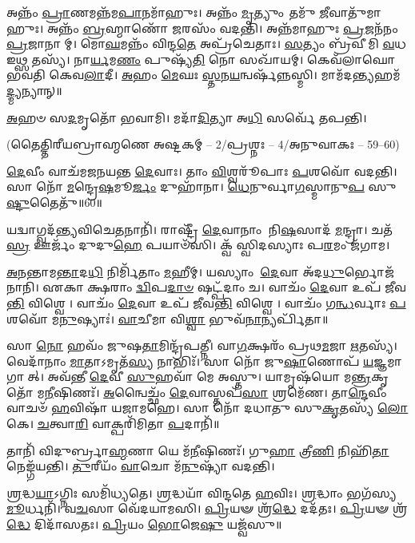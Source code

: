 𑌅𑌨𑍍𑌨𑌂᳴ \ul{𑌪𑍍𑌰𑌾}\-𑌣𑌮𑌨𑍍𑌨᳴𑌮\-\ul{𑌪𑌾}\-𑌨𑌮𑌾᳴𑌹𑍁𑌃।
𑌅𑌨𑍍𑌨𑌂᳴ \ul{𑌮𑍃}\-𑌤𑍍𑌯𑍁𑌂 𑌤𑌮𑍁᳴ \ul{𑌜𑍀}\-𑌵𑌾𑌤𑍁᳴𑌮𑌾𑌹𑍁𑌃।
𑌅𑌨𑍍𑌨𑌂᳴ \ul{𑌬𑍍𑌰}\-𑌹𑍍𑌮𑌾𑌣𑍋᳴ \ul{𑌜}\-𑌰𑌸𑌂᳴  𑌵𑌦𑌨𑍍𑌤𑌿।
𑌅𑌨𑍍𑌨᳴𑌮𑌾𑌹𑍁𑌃 \ul{𑌪𑍍𑌰}\-𑌜𑌨᳴𑌨𑌂 \ul{𑌪𑍍𑌰}\-𑌜𑌾𑌨𑌾𑌮𑍍।
𑌮𑍋\-\ul{𑌘}\-𑌮𑌨𑍍𑌨𑌂᳴ 𑌵𑌿𑌨𑍍𑌦\-\ul{𑌤𑍇} 𑌅𑌪𑍍𑌰᳴𑌚𑍇𑌤𑌾𑌃।
\-\ul{𑌸}\-𑌤𑍍𑌯𑌂 𑌬𑍍𑌰᳴𑌵𑍀𑌮𑌿 \ul{𑌵}\-𑌧 𑌇𑌥𑍍𑌸 𑌤𑌸𑍍𑌯᳴।
𑌨𑌾\-\ul{𑌰𑍍𑌯}\-𑌮\-\ul{𑌣𑌂} 𑌪𑍁𑌷𑍍𑌯᳴\-\ul{𑌤𑌿} 𑌨𑍋 𑌸𑌖𑌾᳴𑌯𑌮𑍍।
𑌕𑍇𑌵᳴𑌲𑌾𑌘𑍋 𑌭𑌵𑌤𑌿 𑌕𑍇𑌵\-\ul{𑌲𑌾}\-𑌦𑍀।
\-\ul{𑌅}\-𑌹𑌂 \ul{𑌮𑍇}\-𑌘𑌃 \ul{𑌸𑍍𑌤}\-𑌨\-\ul{𑌯}\-𑌨𑍍𑌵𑌰𑍍\mbox{}𑌷᳴𑌨𑍍𑌨𑌸𑍍𑌮𑌿।
𑌮𑌾𑌮᳴𑌦\-\ul{𑌨𑍍𑌤𑍍𑌯}\-𑌹𑌮᳴\-\ul{𑌦𑍍𑌮𑍍𑌯}\-𑌨𑍍𑌯𑌾𑌨𑍍॥

\-\ul{𑌅}\-𑌹𑍞 𑌸\-\ul{𑌦}\-𑌮𑍃𑌤𑍋᳴ 𑌭𑌵𑌾𑌮𑌿।
𑌮𑌦𑌾᳴\-\ul{𑌦𑌿}\-𑌤𑍍𑌯𑌾 𑌅\-\ul{𑌧𑌿} 𑌸𑌰𑍍𑌵𑍇᳴ 𑌤𑌪𑌨𑍍𑌤𑌿।

\centerline{\scriptsize (𑌤𑍈𑌤𑍍𑌤𑌿𑌰𑍀𑌯𑌬𑍍𑌰𑌾𑌹𑍍𑌮𑌣𑍇 𑌅𑌷𑍍𑌟𑌕𑌮𑍍 – 2/𑌪𑍍𑌰𑌶𑍍𑌨𑌃 – 4/𑌅𑌨𑍁𑌵𑌾𑌕𑌃 – 59–60)}

\-\ul{𑌦𑍇}\-𑌵𑍀𑌂 𑌵𑌾𑌚᳴𑌮𑌜𑌨𑌯𑌨𑍍𑌤 \ul{𑌦𑍇}\-𑌵𑌾𑌃।
𑌤𑌾𑌂 \ul{𑌵𑌿}\-𑌶𑍍𑌵𑌰𑍂᳴𑌪𑌾𑌃 \ul{𑌪}\-𑌶𑌵𑍋᳴ 𑌵𑌦𑌨𑍍𑌤𑌿।
𑌸𑌾 𑌨𑍋᳴ \ul{𑌮}\-𑌨𑍍𑌦𑍍𑌰𑍇\-\ul{𑌷}\-𑌮𑍂\-\ul{𑌰𑍍𑌜𑌂} 𑌦𑍁𑌹𑌾᳴𑌨𑌾।
\-\ul{𑌧𑍇}\-𑌨𑍁𑌰𑍍𑌵𑌾\-\ul{𑌗}\-𑌸𑍍𑌮𑌾𑌨𑍁\-\ul{𑌪} 𑌸𑍁\-\ul{𑌷𑍍𑌟𑍁}\-𑌤𑍈𑌤𑍁᳴॥60॥


𑌯𑌦𑍍𑌵𑌾𑌗𑍍𑌵𑌦᳴𑌨𑍍𑌤𑍍𑌯𑌵𑌿𑌚𑍇\-\ul{𑌤}\-𑌨𑌾𑌨𑌿᳴।
𑌰𑌾𑌷𑍍𑌟𑍍𑌰𑍀᳴ \ul{𑌦𑍇}\-𑌵𑌾𑌨𑌾𑌂 𑌨𑌿\-\ul{𑌷}\-𑌸𑌾𑌦᳴ \ul{𑌮}\-𑌨𑍍𑌦𑍍𑌰𑌾।
𑌚𑌤᳴\-\ul{𑌸𑍍𑌰} 𑌊𑌰𑍍𑌜𑌂᳴ 𑌦𑍁𑌦𑍁\-\ul{𑌹𑍇} 𑌪𑌯𑌾𑍞᳴𑌸𑌿।
𑌕𑍍𑌵᳴ 𑌸𑍍𑌵𑌿𑌦𑌸𑍍𑌯𑌾𑌃 𑌪\-\ul{𑌰}\-𑌮𑌂 𑌜᳴𑌗𑌾𑌮।

\closesection

\-\ul{𑌅}\-\-\ul{𑌨}\-𑌨𑍍𑌤𑌾𑌮\-\ul{𑌨𑍍𑌤𑌾}\-𑌦\-\ul{𑌧𑌿} 𑌨𑌿𑌰𑍍𑌮𑌿᳴𑌤𑌾𑌂 \ul{𑌮}\-𑌹𑍀𑌮𑍍।
𑌯𑌸𑍍𑌯𑌾𑌂 \ul{𑌦𑍇}\-𑌵𑌾 𑌅᳴𑌦\-\ul{𑌧𑍁}\-𑌰𑍍𑌭𑍋𑌜᳴𑌨𑌾𑌨𑌿।
𑌏𑌕𑌾𑌕𑍍𑌷𑌰𑌾𑌂 \ul{𑌦𑍍𑌵𑌿}\-𑌪\-\ul{𑌦𑌾}\-\-\ul{𑍞} 𑌷𑌟𑍍𑌪᳴𑌦𑌾𑌂 𑌚।
𑌵𑌾𑌚𑌂᳴ \ul{𑌦𑍇}\-𑌵𑌾 𑌉𑌪᳴ 𑌜𑍀𑌵\-\ul{𑌨𑍍𑌤𑌿} 𑌵𑌿𑌶𑍍𑌵𑍇।
𑌵𑌾𑌚𑌂᳴ \ul{𑌦𑍇}\-𑌵𑌾 𑌉𑌪᳴ 𑌜𑍀𑌵\-\ul{𑌨𑍍𑌤𑌿} 𑌵𑌿𑌶𑍍𑌵𑍇।
𑌵𑌾𑌚𑌂᳴ 𑌗\-\ul{𑌨𑍍𑌧}\-𑌰𑍍𑌵𑌾𑌃 \ul{𑌪}\-𑌶𑌵𑍋᳴ 𑌮\-\ul{𑌨𑍁}\-𑌷𑍍𑌯𑌾𑌃॑।
\-\ul{𑌵𑌾}\-𑌚𑍀𑌮𑌾 𑌵𑌿\-\ul{𑌶𑍍𑌵𑌾} 𑌭𑍁𑌵᳴\-\ul{𑌨𑌾}\-𑌨𑍍𑌯𑌰𑍍𑌪𑌿᳴𑌤𑌾॥

𑌸𑌾 \ul{𑌨𑍋} 𑌹𑌵𑌂᳴ 𑌜𑍁𑌷\-\ul{𑌤𑌾}\-𑌮𑌿𑌨𑍍𑌦𑍍𑌰᳴𑌪𑌤𑍍𑌨𑍀।
𑌵𑌾\-\ul{𑌗}\-𑌕𑍍𑌷𑌰𑌂᳴ 𑌪𑍍𑌰𑌥\-\ul{𑌮}\-𑌜𑌾 \ul{𑌋}\-𑌤𑌸𑍍𑌯᳴।
𑌵𑍇𑌦𑌾᳴𑌨𑌾𑌂 \ul{𑌮𑌾}\-𑌤𑌾𑌽𑌮𑍃𑌤᳴\-\ul{𑌸𑍍𑌯} 𑌨𑌾𑌭𑌿𑌃᳴।
𑌸𑌾 𑌨𑍋᳴ 𑌜𑍁\-\ul{𑌷𑌾}\-𑌣𑍋𑌪᳴ \ul{𑌯}\-𑌜𑍍𑌞𑌮𑌾𑌗𑌾𑌤𑍍।
𑌅𑌵᳴𑌨𑍍𑌤𑍀 \ul{𑌦𑍇}\-𑌵𑍀 \ul{𑌸𑍁}\-𑌹𑌵𑌾᳴ 𑌮𑍇 𑌅𑌸𑍍𑌤𑍁।
𑌯𑌾𑌮𑍃𑌷᳴𑌯𑍋 𑌮\-\ul{𑌨𑍍𑌤𑍍𑌰}\-𑌕𑍃𑌤𑍋᳴ 𑌮\-\ul{𑌨𑍀}\-𑌷𑌿𑌣𑌃᳴।
\-\ul{𑌅}\-𑌨𑍍𑌵𑍈𑌚𑍍𑌛𑌂᳴ \ul{𑌦𑍇}\-𑌵𑌾𑌸𑍍𑌤𑌪᳴\-\ul{𑌸𑌾} 𑌶𑍍𑌰𑌮𑍇᳴𑌣।
𑌤𑌾\-\ul{𑌨𑍍𑌦𑍇}\-𑌵𑍀𑌂 𑌵𑌾𑌚𑍞᳴ \ul{𑌹}\-𑌵𑌿𑌷𑌾᳴ 𑌯𑌜𑌾𑌮𑌹𑍇।
𑌸𑌾 𑌨𑍋᳴ 𑌦𑌧𑌾𑌤𑍁 𑌸𑍁\-\ul{𑌕𑍃}\-𑌤𑌸𑍍𑌯᳴ \ul{𑌲𑍋}\-𑌕𑍇।
\-\ul{𑌚}\-𑌤𑍍𑌵𑌾\-\ul{𑌰𑌿} 𑌵𑌾𑌕𑍍𑌪𑌰𑌿᳴𑌮𑌿𑌤𑌾 \ul{𑌪}\-𑌦𑌾𑌨𑌿᳴॥

𑌤𑌾𑌨𑌿᳴ 𑌵𑌿𑌦𑍁𑌰𑍍𑌬𑍍𑌰𑌾\-\ul{𑌹𑍍𑌮}\-𑌣𑌾 𑌯𑍇 𑌮᳴\-\ul{𑌨𑍀}\-𑌷𑌿𑌣𑌃᳴।
𑌗𑍁\-\ul{𑌹𑌾} 𑌤𑍍𑌰𑍀\-\ul{𑌣𑌿} 𑌨𑌿𑌹𑌿᳴\-\ul{𑌤𑌾} 𑌨𑍇𑌙𑍍𑌗᳴𑌯𑌨𑍍𑌤𑌿।
\-\ul{𑌤𑍁}\-𑌰𑍀𑌯𑌂᳴ \ul{𑌵𑌾}\-𑌚𑍋 𑌮᳴\-\ul{𑌨𑍁}\-𑌷𑍍𑌯𑌾᳴ 𑌵𑌦𑌨𑍍𑌤𑌿।


\-\ul{𑌶𑍍𑌰}\-𑌦𑍍𑌧\-\ul{𑌯𑌾}\-𑌽𑌗𑍍𑌨𑌿𑌃 𑌸𑌮𑌿᳴𑌧𑍍𑌯𑌤𑍇।
\-\ul{𑌶𑍍𑌰}\-𑌦𑍍𑌧𑌯𑌾᳴ 𑌵𑌿𑌨𑍍𑌦𑌤𑍇 \ul{𑌹}\-𑌵𑌿𑌃।
\-\ul{𑌶𑍍𑌰}\-𑌦𑍍𑌧𑌾𑌂 𑌭𑌗᳴𑌸𑍍𑌯 \ul{𑌮𑍂}\-𑌰𑍍𑌧𑌨𑌿᳴।
𑌵\-\ul{𑌚}\-𑌸𑌾 𑌵𑍇᳴𑌦𑌯𑌾𑌮𑌸𑌿।
\-\ul{𑌪𑍍𑌰𑌿}\-𑌯𑍟 𑌶𑍍𑌰᳴\-\ul{𑌦𑍍𑌧𑍇} 𑌦𑌦᳴𑌤𑌃।
\-\ul{𑌪𑍍𑌰𑌿}\-𑌯𑍟 𑌶𑍍𑌰᳴\-\ul{𑌦𑍍𑌧𑍇} 𑌦𑌿𑌦𑌾᳴𑌸𑌤𑌃।
\-\ul{𑌪𑍍𑌰𑌿}\-𑌯𑌂 \ul{𑌭𑍋}\-𑌜𑍇\-\ul{𑌷𑍁} 𑌯𑌜𑍍𑌵᳴𑌸𑍁॥

